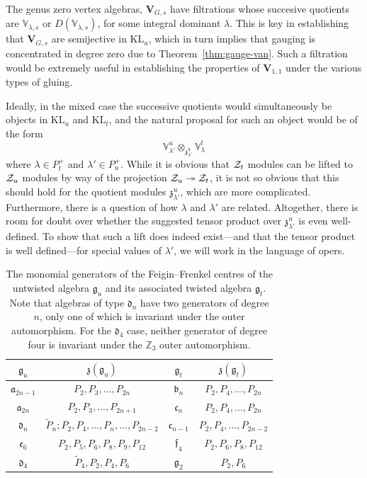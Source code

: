 \documentclass[a4paper]{article}
\def\IV{\mathbb{V}}
\def\IZ{\mathbb{Z}}
\def\ZZ{{\cal Z}}
\def\af{\mathfrak{a}}
\def\df{\mathfrak{d}}
\def\ef{\mathfrak{e}}
\def\gf{\mathfrak{g}}
\def \ff{\mathfrak{f}}
\def \zf{\mathfrak{z}}
\def \KL{\mathrm{KL}}
\def\V{\mathbf{V}}
\begin{document}
The genus zero vertex algebras, $\V_{G,s}$ have filtrations whose succesive quotients are $\IV_{\lambda,s}$ or $D(\IV_{\lambda,s})$, for some integral dominant $\lambda$. This is key in establishing that $\V_{G,s}$ are semijective in $\KL_u$, which in turn implies that gauging is concentrated in degree zero due to Theorem~\ref{thm:gauge-van}. Such a filtration would be extremely useful in establishing the properties of $\V_{1,1}$ under the various types of gluing.

Ideally, in the mixed case the successive quotients would simultaneously be objects in $\KL_u$ and $\KL_t$, and the natural proposal for such an object would be of the form
\begin{equation}
	\IV_{\lambda'}^u\otimes_{\zf^u_{\lambda'}}\IV_{\lambda}^t
\end{equation}
where $\lambda\in P_t^+$ and $\lambda'\in P_u^+$. While it is obvious that $\ZZ_t$ modules can be lifted to $\ZZ_u$ modules by way of the projection $\ZZ_u\twoheadrightarrow \ZZ_t$, it is not so obvious that this should hold for the quotient modules $\zf^u_{\lambda'}$, which are more complicated. Furthermore, there is a question of how $\lambda$ and $\lambda'$ are related. Altogether, there is room for doubt over whether the suggested tensor product over $\zf^u_{\lambda'}$ is even well-defined. To show that such a lift does indeed exist---and that the tensor product is well defined---for special values of $\lambda'$, we will work in the language of opers.

\begin{table}
	\centering
{\setlength{\extrarowheight}{2.0pt}
\begin{tabular}{ c | c | c | c }
 $\gf_u$ & $\mathfrak{z}(\gf_u)$ & $\gf_t$ & $\mathfrak{z}(\gf_t)$\\
\hline
\hline
$\af_{2n-1}$ & $P_2, P_3,\dots,P_{2n}$ & ${\mathfrak b}_n$ & $P_2,P_4,\dots,P_{2n}$ \\ \hline
$\af_{2n}$ & $P_2, P_3,\dots,P_{2n+1}$ & ${\mathfrak c}_n$ & $P_2,P_4,\dots,P_{2n}$\\ \hline
$\df_{n}$ & $\tilde{P}_n;P_2,P_4,\dots,P_n,\dots,P_{2n-2}$ & ${\mathfrak c}_{n-1}$ & $P_2,P_4,\dots,P_{2n-2}$\\ \hline
$\ef_{6}$ & $P_2,P_5,P_6,P_8,P_9,P_{12}$ & $\ff_4$ & $P_2,P_6,P_8,P_{12}$\\ \hline
$\df_4$ & $\tilde{P}_4,P_2,P_4,P_6$ & $\gf_2$ & $P_2,P_6$
\end{tabular}}

	\caption{\label{tab:FF-twists}The monomial generators of the Feigin--Frenkel centres of the untwisted algebra $\gf_u$ and its associated twisted algebra $\gf_t$. Note that algebras of type $\df_n$ have two generators of degree $n$, only one of which is invariant under the outer automorphism. For the $\df_4$ case, neither generator of degree four is invariant under the $\IZ_3$ outer automorphism.}
\end{table}
\end{document}
